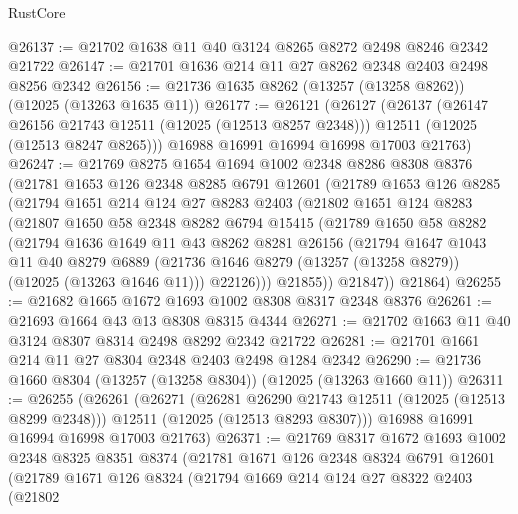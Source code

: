 \begin{lexlean}{RustCore}
\begin{coremodule}
@26137 := @21702 @1638 @11 @40 @3124 @8265 @8272 @2498 @8246 @2342 @21722
@26147 := @21701 @1636 @214 @11 @27 @8262 @2348 @2403 @2498 @8256 @2342
@26156 := @21736 @1635 @8262 (@13257 (@13258 @8262)) (@12025 (@13263 @1635 @11))
@26177 := @26121
    (@26127
      (@26137
        (@26147 @26156 @21743 @12511 (@12025 (@12513 @8257 @2348)))
        @12511
        (@12025 (@12513 @8247 @8265)))
      @16988
      @16991
      @16994
      @16998
      @17003
      @21763)
@26247 := @21769
    @8275
    @1654
    @1694
    @1002
    @2348
    @8286
    @8308
    @8376
    (@21781
      @1653
      @126
      @2348
      @8285
      @6791
      @12601
      (@21789
        @1653
        @126
        @8285
        (@21794
          @1651
          @214
          @124
          @27
          @8283
          @2403
          (@21802
            @1651
            @124
            @8283
            (@21807
              @1650
              @58
              @2348
              @8282
              @6794
              @15415
              (@21789
                @1650
                @58
                @8282
                (@21794
                  @1636
                  @1649
                  @11
                  @43
                  @8262
                  @8281
                  @26156
                  (@21794
                    @1647
                    @1043
                    @11
                    @40
                    @8279
                    @6889
                    (@21736 @1646 @8279 (@13257 (@13258 @8279)) (@12025 (@13263 @1646 @11)))
                    @22126)))
              @21855))
          @21847))
      @21864)
@26255 := @21682 @1665 @1672 @1693 @1002 @8308 @8317 @2348 @8376
@26261 := @21693 @1664 @43 @13 @8308 @8315 @4344
@26271 := @21702 @1663 @11 @40 @3124 @8307 @8314 @2498 @8292 @2342 @21722
@26281 := @21701 @1661 @214 @11 @27 @8304 @2348 @2403 @2498 @1284 @2342
@26290 := @21736 @1660 @8304 (@13257 (@13258 @8304)) (@12025 (@13263 @1660 @11))
@26311 := @26255
    (@26261
      (@26271
        (@26281 @26290 @21743 @12511 (@12025 (@12513 @8299 @2348)))
        @12511
        (@12025 (@12513 @8293 @8307)))
      @16988
      @16991
      @16994
      @16998
      @17003
      @21763)
@26371 := @21769
    @8317
    @1672
    @1693
    @1002
    @2348
    @8325
    @8351
    @8374
    (@21781
      @1671
      @126
      @2348
      @8324
      @6791
      @12601
      (@21789
        @1671
        @126
        @8324
        (@21794
          @1669
          @214
          @124
          @27
          @8322
          @2403
          (@21802

\end{coremodule}
\end{lexlean}

